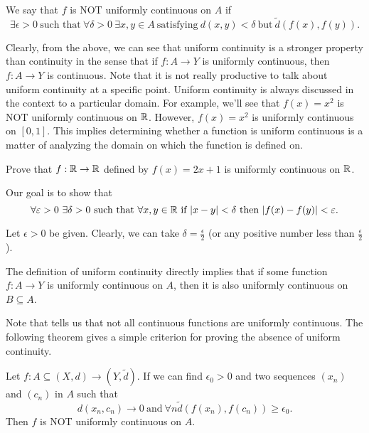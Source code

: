 \documentclass[a4paper]{article}
\begin{document}
\begin{remark}
   We say that \( f \) is NOT uniformly continuous on \( A  \) if 
   \[ \exists \epsilon > 0 \ \text{such that} \ \forall \delta > 0 \ \exists x,y \in A \ \text{satisfying} \ d(x,y) < \delta \ \text{but} \ \tilde{d}(f(x),f(y)).  \] 
\end{remark}

Clearly, from the above, we can see that uniform continuity is a stronger property than continuity in the sense that if \( f: A \to Y  \) is uniformly continuous, then \( f: A \to Y \) is continuous. Note that it is not really productive to talk about uniform continuity at a specific point. Uniform continuity is always discussed in the context to a particular domain. For example, we'll see that \( f(x) = x^{2} \) is NOT uniformly continuous on \( \mathbb{R}  \). However, \( f(x) = x^{2} \) is uniformly continuous on \( [0,1] \). This implies determining whether a function is uniform continuous is a matter of analyzing the domain on which the function is defined on.

\begin{eg}
    Prove that \( f: \mathbb{R} \to \mathbb{R}  \) defined by \( f(x) = 2x + 1 \) is uniformly continuous on \( \mathbb{R}  \). 

    Our goal is to show that 
    \[  \forall \varepsilon > 0  \ \exists \delta > 0 \ \text{such that} \ \forall x,y \in \mathbb{R} \ \text{if} \ | x - y  |  < \delta \ \text{then} \ | f(x) - f(y) | < \varepsilon.  \]

    Let \( \epsilon > 0  \) be given. Clearly, we can take \( \delta = \frac{ \epsilon }{ 2 }  \) (or any positive number less than \( \frac{ \epsilon }{ 2 }  \)).
\end{eg}

The definition of uniform continuity directly implies that if some function \( f : A \to Y  \) is uniformly continuous on \(  A  \), then it is also uniformly continuous on \( B \subseteq  A  \). 

Note that tells us that not all continuous functions are uniformly continuous. The following theorem gives a simple criterion for proving the absence of uniform continuity. 

\begin{theorem}[ ]
    Let \( f: A \subseteq  (X,d) \to (Y, \tilde{d}) \). If we can find \( {\epsilon}_{0} > 0 \) and two sequences \( ({x}_{n}) \) and \( ({c}_{n}) \) in \( A  \) such that  
    \[  d({x}_{n}, {c}_{n}) \to 0 \ \text{and} \ \forall n \tilde{d}(f({x}_{n}), f({c}_{n})) \geq {\epsilon}_{0}. \]
    Then \( f  \) is NOT uniformly continuous on \( A  \).
\end{theorem}
\end{document}
